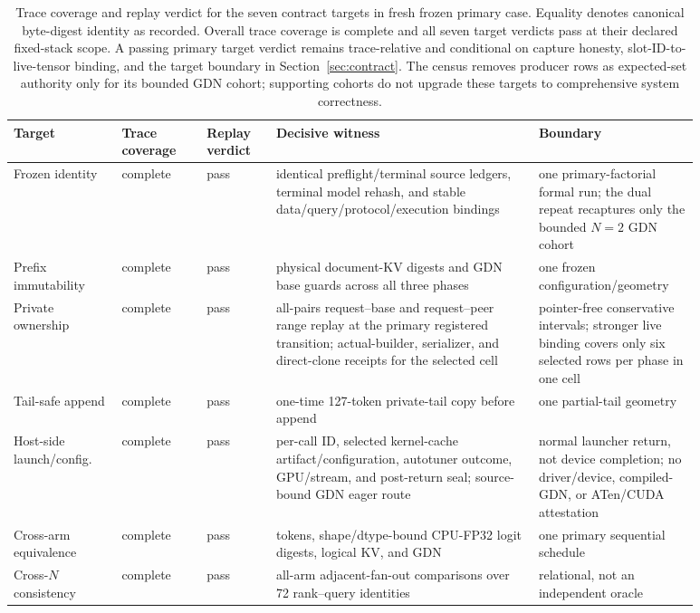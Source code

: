 \documentclass{article}
\begin{document}
\begin{table}[H]
  \caption{Trace coverage and replay verdict for the seven contract targets in
  fresh frozen primary case.  Equality denotes canonical byte-digest identity
  as recorded.  Overall trace coverage is complete and all seven target
  verdicts pass at their declared fixed-stack scope.  A passing primary
  target verdict remains trace-relative and conditional on capture honesty,
  slot-ID-to-live-tensor binding, and the target boundary in Section~\ref{sec:contract}.
  The census removes producer rows as expected-set authority only for its bounded
  GDN cohort; supporting cohorts do not upgrade these targets to comprehensive
  system correctness.}
  \label{tab:witness}
  \centering
  \scriptsize
  \begin{tabular}{@{}>{\raggedright\arraybackslash}p{0.14\linewidth}p{0.11\linewidth}p{0.09\linewidth}>{\raggedright\arraybackslash}p{0.34\linewidth}>{\raggedright\arraybackslash}p{0.20\linewidth}@{}}
    \toprule
    Target & Trace coverage & Replay verdict & Decisive witness & Boundary \\
    \midrule
    Frozen identity & complete & pass & identical preflight/terminal source ledgers, terminal model rehash, and stable data/query/protocol/execution bindings & one primary-factorial formal run; the dual repeat recaptures only the bounded $N=2$ GDN cohort \\
    Prefix immutability & complete & pass & physical document-KV digests and GDN base guards across all three phases & one frozen configuration/geometry \\
    Private ownership & complete & pass & all-pairs request--base and request--peer range replay at the primary registered transition; actual-builder, serializer, and direct-clone receipts for the selected cell & pointer-free conservative intervals; stronger live binding covers only six selected rows per phase in one cell \\
    Tail-safe append & complete & pass & one-time 127-token private-tail copy before append & one partial-tail geometry \\
    Host-side launch/config. & complete & pass & per-call ID, selected kernel-cache artifact/configuration, autotuner outcome, GPU/stream, and post-return seal; source-bound GDN eager route & normal launcher return, not device completion; no driver/device, compiled-GDN, or ATen/CUDA attestation \\
    Cross-arm equivalence & complete & pass & tokens, shape/dtype-bound CPU-FP32 logit digests, logical KV, and GDN & one primary sequential schedule \\
    Cross-$N$ consistency & complete & pass & 288 all-arm adjacent-fan-out comparisons over 72 rank--query identities & relational, not an independent oracle \\
    \bottomrule
  \end{tabular}
\end{table}
\end{document}
